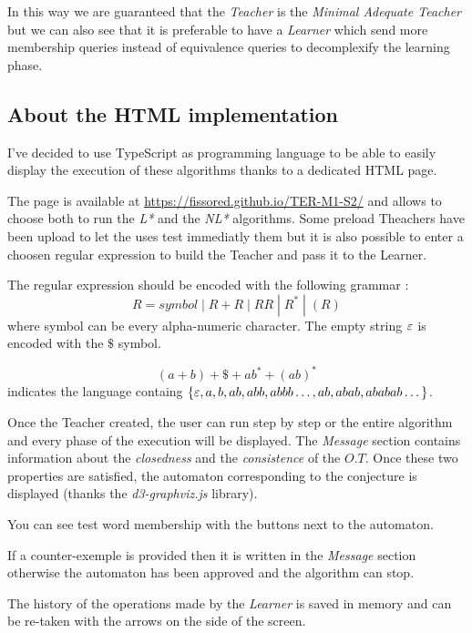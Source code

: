 In this way we are guaranteed that the \textit{Teacher} is the \textit{Minimal Adequate Teacher} but we can also see that it is preferable to have a \textit{Learner} which send more membership queries instead of equivalence queries to decomplexify the learning phase.

\subsection{About the HTML implementation}

I've decided to use TypeScript as programming language to be able to easily display the execution of these algorithms thanks to a dedicated HTML page.

The page is available at \url{https://fissored.github.io/TER-M1-S2/} and allows to choose both to run the \textit{L*} and the \textit{NL*} algorithms. Some preload Theachers have been upload to let the uses test immediatly them but it is also possible to enter a choosen regular expression to build the Teacher and pass it to the Learner.

The regular expression should be encoded with the following grammar :
\[ R = symbol \; | \; R + R \; | \; RR \; | \;R^* \; | \;(R) \]
where symbol can be every alpha-numeric character. The empty string $\varepsilon$ is encoded with the $\$$ symbol.

\begin{example}
  \[(a + b)+\$+ab^*+(ab)^*\] indicates the language containg $\{\varepsilon,a, b,  ab, abb, abbb\dots, ab, abab, ababab\dots\}$.
\end{example}

Once the Teacher created, the user can run step by step or the entire algorithm and every phase of the execution will be displayed. The \textit{Message} section contains information about the \textit{closedness} and the \textit{consistence} of the $O.T$. Once these two properties are satisfied, the automaton corresponding to the conjecture is displayed (thanks the \textit{d3-graphviz.js} library).

You can see test word membership with the buttons next to the automaton.

If a counter-exemple is provided then it is written in the \textit{Message} section otherwise the automaton has been approved and the algorithm can stop.

The history of the operations made by the \textit{Learner} is saved in memory and can be re-taken with the arrows on the side of the screen.


